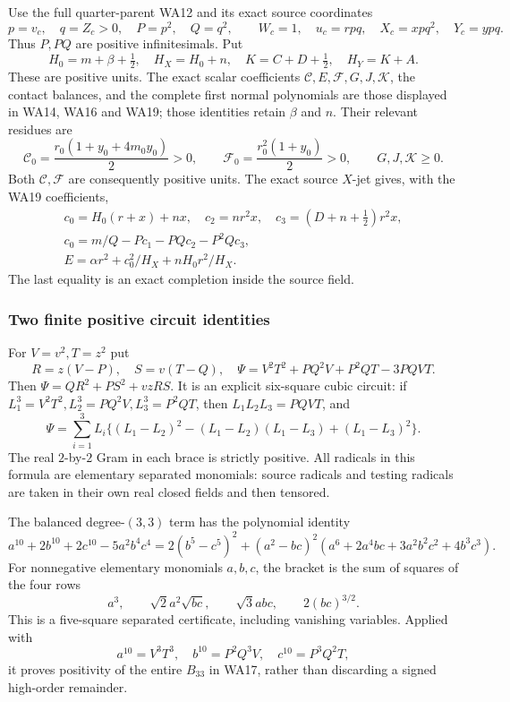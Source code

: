 Use the full quarter-parent WA12 and its exact source coordinates
\[
 p=v_c,\quad q=Z_c>0,\quad P=p^2,\quad Q=q^2,\qquad
 W_c=1,\quad u_c=rpq,\quad X_c=xpq^2,\quad Y_c=ypq.
 \tag{WN1}
\]
Thus \(P,PQ\) are positive infinitesimals. Put
\[
 H_0=m+\beta+\tfrac12,\quad H_X=H_0+n,\quad
 K=C+D+\tfrac12,\quad H_Y=K+A.
 \tag{WN2}
\]
These are positive units. The exact scalar coefficients
\(\mathcal C,E,\mathcal F,G,J,\mathcal K\), the contact balances, and
the complete first normal polynomials are those displayed in
WA14, WA16 and WA19; those identities retain \(\beta\) and \(n\).
Their relevant residues are
\[
 \mathcal C_0=\frac{r_0(1+y_0+4m_0y_0)}2>0,\qquad
 \mathcal F_0=\frac{r_0^2(1+y_0)}2>0,
 \qquad G,J,\mathcal K\geq0 .
 \tag{WN3}
\]
Both \(\mathcal C,\mathcal F\) are consequently positive units.
The exact source \(X\)-jet gives, with the WA19 coefficients,
\[
\begin{gathered}
 c_0=H_0(r+x)+nx,\quad c_2=nr^2x,\quad
 c_3=(D+n+\tfrac12)r^2x,\\
 c_0=m/Q-Pc_1-PQc_2-P^2Qc_3,\\
 E=\alpha r^2+c_0^2/H_X+nH_0r^2/H_X .
\end{gathered}\tag{WN4}
\]
The last equality is an exact completion inside the source field.

\subsubsection*{Two finite positive circuit identities}

For \(V=v^2,T=z^2\) put
\[
 R=z(V-P),\quad S=v(T-Q),\quad
 \Psi=V^2T^2+PQ^2V+P^2QT-3PQVT .
\]
Then \(\Psi=QR^2+PS^2+vzRS\). It is an explicit six-square
cubic circuit: if \(L_1^3=V^2T^2,L_2^3=PQ^2V,L_3^3=P^2QT\),
then \(L_1L_2L_3=PQVT\), and
\[
 \Psi=\sum_{i=1}^3 L_i
 \bigl\{(L_1-L_2)^2-(L_1-L_2)(L_1-L_3)+(L_1-L_3)^2\bigr\}.
 \tag{WN5}
\]
The real \(2\)-by-\(2\) Gram in each brace is strictly positive.
All radicals in this formula are elementary separated monomials:
source radicals and testing radicals are taken in their own real
closed fields and then tensored.

The balanced degree-\((3,3)\) term has the polynomial identity
\[
 a^{10}+2b^{10}+2c^{10}-5a^2b^4c^4
 =2(b^5-c^5)^2
 +(a^2-bc)^2(a^6+2a^4bc+3a^2b^2c^2+4b^3c^3).
 \tag{WN6}
\]
For nonnegative elementary monomials \(a,b,c\), the bracket is the
sum of squares of the four rows
\[
 a^3,\qquad \sqrt2a^2\sqrt{bc},\qquad
 \sqrt3abc,\qquad 2(bc)^{3/2}.
\]
This is a five-square separated certificate, including vanishing
variables. Applied with
\[
 a^{10}=V^3T^3,\quad b^{10}=P^2Q^3V,\quad c^{10}=P^3Q^2T,
\]
it proves positivity of the entire \(B_{33}\) in WA17, rather than
discarding a signed high-order remainder.

